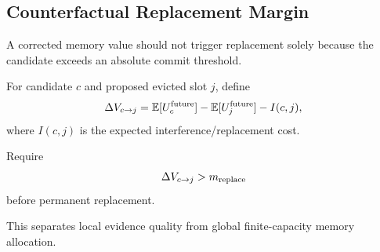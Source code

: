 \subsection{Counterfactual Replacement Margin}

A corrected memory value should not trigger replacement solely because the candidate exceeds an absolute commit threshold.

For candidate $c$ and proposed evicted slot $j$, define
\[
\Delta V_{c\rightarrow j}
=
\mathbb E[U_c^{\rm future}]
-
\mathbb E[U_j^{\rm future}]
-
I(c,j),
\]
where $I(c,j)$ is the expected interference/replacement cost.

Require
\[
\Delta V_{c\rightarrow j}>m_{\rm replace}
\]
before permanent replacement.

This separates local evidence quality from global finite-capacity memory allocation.

